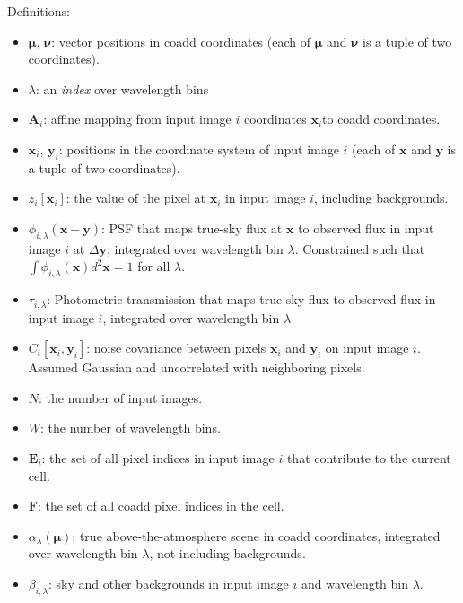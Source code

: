 \documentclass[DM,authoryear,toc]{lsstdoc}
\begin{document}
Definitions:
\begin{itemize}
\item $\bm{\mu}$, $\bm{\nu}$: vector positions in coadd coordinates (each of $\bm{\mu}$ and $\bm{\nu}$ is a tuple of two coordinates).
\item $\lambda$: an \emph{index} over wavelength bins
\item $\bm{A}_i$: affine mapping from input image $i$ coordinates $\bm{x}_i$to coadd coordinates.
\item $\bm{x}_{i}$, $\bm{y}_i$: positions in the coordinate system of input image $i$ (each of $\bm{x}$ and $\bm{y}$ is a tuple of two coordinates).
\item $z_{i}[\bm{x}_i]$: the value of the pixel at $\bm{x}_i$ in input image $i$, including backgrounds.
\item $\phi_{i,\lambda}(\bm{x}-\bm{y})$: PSF that maps true-sky flux at $\bm{x}$ to observed flux in input image $i$ at $\Delta\bm{y}$, integrated over wavelength bin $\lambda$.  Constrained such that
$\int \phi_{i,\lambda}(\bm{x}) d^2\bm{x} = 1$ for all $\lambda$.
\item $\tau_{i,\lambda}$: Photometric transmission that maps true-sky flux to observed flux in input image $i$, integrated over wavelength bin $\lambda$
\item $C_{i}[\bm{x}_i, \bm{y}_i]$: noise covariance between pixels $\bm{x}_i$ and $\bm{y}_i$ on input image $i$.  Assumed Gaussian and uncorrelated with neighboring pixels.
\item $N$: the number of input images.
\item $W$: the number of wavelength bins.
\item $\bm{E}_i$: the set of all pixel indices in input image $i$ that contribute to the current cell.
\item $\bm{F}$: the set of all coadd pixel indices in the cell.
\item $\alpha_{\lambda}(\bm{\mu})$: true above-the-atmosphere scene in coadd coordinates, integrated over wavelength bin $\lambda$, not including backgrounds.
\item $\beta_{i,\lambda}$: sky and other backgrounds in input image $i$ and wavelength bin $\lambda$.
\end{itemize}
\end{document}
